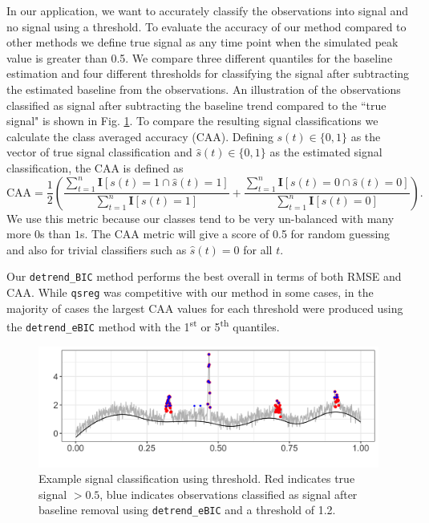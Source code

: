 \documentclass[12pt]{article}
\begin{document}
	In our application, we want to accurately classify the observations into signal and no signal using a threshold. To evaluate the accuracy of our method compared to other methods we define true signal as any time point when the simulated peak value is greater than 0.5. We compare three different quantiles for the baseline estimation and four different thresholds for classifying the signal after subtracting the estimated baseline from the observations.  An illustration of the observations classified as signal after subtracting the baseline trend compared to the ``true signal" is shown in Fig. \ref{fig:peaks_class_eg}. To compare the resulting signal classifications we calculate the class averaged accuracy (CAA). Defining $s(t) \in \{0,1\}$ as the vector of true signal classification and $\hat{s}(t) \in \{0,1\}$ as the estimated signal classification, the CAA is defined as
	\begin{equation}
	\mbox{CAA} = \frac{1}{2}\left(\frac{\sum_{t=1}^n \mathbf{I}[s(t) = 1 \cap \hat{s}(t)=1]}{\sum_{t=1}^n \mathbf{I}[s(t) = 1]} + \frac{\sum_{t=1}^n \mathbf{I}[s(t) = 0 \cap \hat{s}(t)=0]}{\sum_{t=1}^n \mathbf{I}[s(t) = 0]}\right).
	\end{equation}  
	We use this metric because our classes tend to be very un-balanced with many more $0$s than $1$s. The CAA metric will give a score of 0.5 for random guessing and also for trivial classifiers such as $\hat{s}(t) = 0$ for all $t$. 

	Our \texttt{detrend\_BIC} method performs the best overall in terms of both RMSE and CAA. While \texttt{qsreg} was competitive with our method in some cases, in the majority of cases the largest CAA values for each threshold were produced using the \texttt{detrend\_eBIC} method with the 1\textsuperscript{st} or 5\textsuperscript{th} quantiles. 
	
	\begin{figure}[h!]
		\includegraphics[width = \linewidth]{Figures/peaks_eg_class.png}
		\caption{Example signal classification using threshold. Red indicates true signal $>0.5$, blue indicates observations classified as signal after baseline removal using \texttt{detrend\_eBIC} and a threshold of 1.2.}
		\label{fig:peaks_class_eg}
	\end{figure}
	
\end{document}
